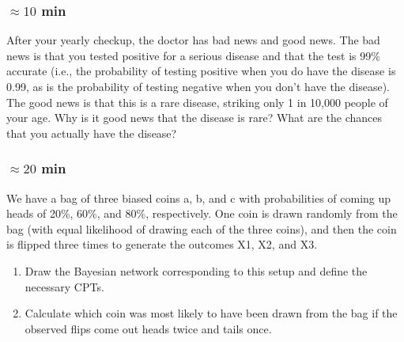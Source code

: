 \documentclass[a4paper, 10pt]{article}
\begin{document}
    \subsubsection{$\approx 10$ min}
    After your yearly checkup, the doctor has bad news and good news. The bad news
is that you tested positive for a serious disease and that the test is 99\% accurate (i.e., the
probability of testing positive when you do have the disease is 0.99, as is the probability of
testing negative when you don’t have the disease). The good news is that this is a rare disease,
striking only 1 in 10,000 people of your age. Why is it good news that the disease is rare?
What are the chances that you actually have the disease?
\subsubsection{$\approx 20$ min}
We have a bag of three biased coins a, b, and c with probabilities of coming up heads
of 20\%, 60\%, and 80\%, respectively. One coin is drawn randomly from the bag (with equal
likelihood of drawing each of the three coins), and then the coin is flipped three times to
generate the outcomes X1, X2, and X3.
\begin{enumerate}
    \item Draw the Bayesian network corresponding to this setup and define the necessary CPTs.
    \item Calculate which coin was most likely to have been drawn from the bag if the observed
flips come out heads twice and tails once.
\end{enumerate}
\end{document}

